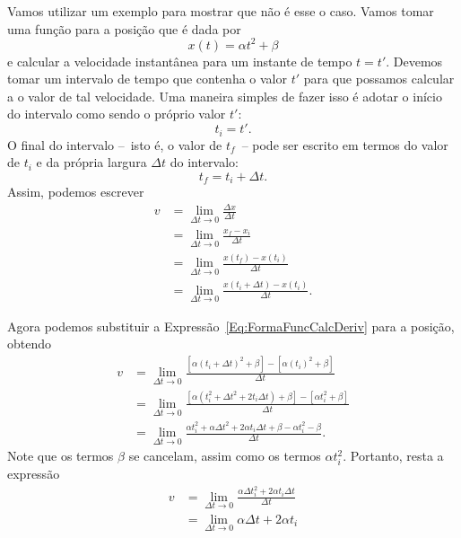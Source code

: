 Vamos utilizar um exemplo para mostrar que não é esse o caso. Vamos tomar uma função para a posição que é dada por
\begin{equation}\label{Eq:FormaFuncCalcDeriv}
    x(t) = \alpha t^2 + \beta
\end{equation}
%
e calcular a velocidade instantânea para um instante de tempo $t = t'$. Devemos tomar um intervalo de tempo que contenha o valor $t'$ para que possamos calcular a o valor de tal velocidade. Uma maneira simples de fazer isso é adotar o início do intervalo como sendo o próprio valor $t'$:
\begin{equation}
    t_i = t'.
\end{equation}
%
O final do intervalo --~isto é, o valor de $t_f$~-- pode ser escrito em termos do valor de $t_i$ e da própria largura $\Delta t$ do intervalo:
\begin{equation}
    t_f = t_i + \Delta t.
\end{equation}
%
Assim, podemos escrever
\begin{align}
    v & = \lim_{\Delta t \to 0} \frac{\Delta x}{\Delta t} \\
    &= \lim_{\Delta t \to 0} \frac{x_f - x_i}{\Delta t} \\
    &= \lim_{\Delta t \to 0} \frac{x(t_f) - x(t_i)}{\Delta t} \\
    &= \lim_{\Delta t \to 0} \frac{x(t_i + \Delta t) - x(t_i)}{\Delta t}.
\end{align}

Agora podemos substituir a Expressão~\eqref{Eq:FormaFuncCalcDeriv} para a posição, obtendo
\begin{align}
    v & = \lim_{\Delta t \to 0} \frac{[\alpha (t_i + \Delta t)^2 + \beta]-[\alpha (t_i)^2 + \beta]}{\Delta t} \\
    &= \lim_{\Delta t \to 0} \frac{[\alpha (t_i^2 + \Delta t^2 + 2t_i\Delta t) + \beta]-[\alpha t_i^2 + \beta]}{\Delta t} \\
    &= \lim_{\Delta t \to 0} \frac{\alpha t_i^2 + \alpha\Delta t^2 + 2\alpha t_i\Delta t + \beta - \alpha t_i^2 - \beta}{\Delta t}.
\end{align}
%
Note que os termos $\beta$ se cancelam, assim como os termos $\alpha t_i^2$. Portanto, resta a expressão
\begin{align}
    v &= \lim_{\Delta t \to 0} \frac{\alpha\Delta t_i^2 + 2\alpha t_i\Delta t}{\Delta t} \\
    &= \lim_{\Delta t \to 0} \alpha\Delta t + 2\alpha t_i
\end{align}


